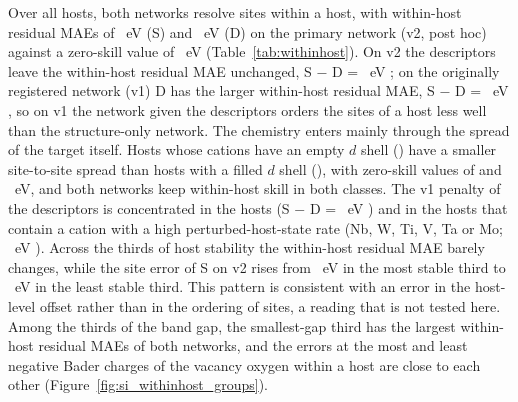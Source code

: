 Over all hosts, both networks resolve sites within a host, with within-host residual MAEs of
\numWithinHostBreakdownGroupsPooledAllVTwoSWithinHostMaePoint{}~eV (S) and
\numWithinHostBreakdownGroupsPooledAllVTwoDWithinHostMaePoint{}~eV (D) on the primary network (v2, post hoc)
against a zero-skill value of \numWithinHostBreakdownGroupsPooledAllVTwoSZeroSkillMaePoint{}~eV
(Table~\ref{tab:withinhost}). On v2 the descriptors leave the within-host residual MAE unchanged, S $-$ D =
\numWithinHostBreakdownGroupsPooledAllDifferencesSMinusDVTwoWithinHostMaePoint{}~eV
\ci{\numWithinHostBreakdownGroupsPooledAllDifferencesSMinusDVTwoWithinHostMaeCiNinetyFiveItemOne{}}{\numWithinHostBreakdownGroupsPooledAllDifferencesSMinusDVTwoWithinHostMaeCiNinetyFiveItemTwo{}};
on the originally registered network (v1) D has the larger within-host residual MAE, S $-$ D =
\numWithinHostBreakdownGroupsPooledAllDifferencesSMinusDVOneWithinHostMaePoint{}~eV
\ci{\numWithinHostBreakdownGroupsPooledAllDifferencesSMinusDVOneWithinHostMaeCiNinetyFiveItemOne{}}{\numWithinHostBreakdownGroupsPooledAllDifferencesSMinusDVOneWithinHostMaeCiNinetyFiveItemTwo{}},
so on v1 the network given the descriptors orders the sites of a host less well than the structure-only network.
The chemistry enters mainly through the spread of the target itself. Hosts whose cations have an empty $d$ shell
(\dzero{}) have a smaller site-to-site spread than hosts with a filled $d$ shell (\dten{}), with zero-skill values of
\numWithinHostBreakdownGroupsDClassDZeroVTwoSZeroSkillMaePoint{} and
\numWithinHostBreakdownGroupsDClassDTenVTwoSZeroSkillMaePoint{}~eV, and both networks keep within-host skill in both
classes. The v1 penalty of the descriptors is concentrated in the \dten{} hosts
(S $-$ D = \numWithinHostBreakdownGroupsDClassDTenDifferencesSMinusDVOneWithinHostMaePoint{}~eV
\ci{\numWithinHostBreakdownGroupsDClassDTenDifferencesSMinusDVOneWithinHostMaeCiNinetyFiveItemOne{}}{\numWithinHostBreakdownGroupsDClassDTenDifferencesSMinusDVOneWithinHostMaeCiNinetyFiveItemTwo{}})
and in the hosts that contain a cation with a high perturbed-host-state rate (Nb, W, Ti, V, Ta or Mo;
\numWithinHostBreakdownGroupsPhsPronePhsProneDifferencesSMinusDVOneWithinHostMaePoint{}~eV
\ci{\numWithinHostBreakdownGroupsPhsPronePhsProneDifferencesSMinusDVOneWithinHostMaeCiNinetyFiveItemOne{}}{\numWithinHostBreakdownGroupsPhsPronePhsProneDifferencesSMinusDVOneWithinHostMaeCiNinetyFiveItemTwo{}}).
Across the thirds of host stability the within-host residual MAE barely changes, while the site error of S on v2 rises
from \numWithinHostBreakdownGroupsStabilityTercileLowerVTwoSMaePoint{}~eV in the most stable third to
\numWithinHostBreakdownGroupsStabilityTercileUpperVTwoSMaePoint{}~eV in the least stable third. This pattern is
consistent with an error in the host-level offset rather than in the ordering of sites, a reading that is not
tested here. Among the thirds of the band gap, the smallest-gap third has the largest within-host residual MAEs of both
networks, and the errors at the most and least negative Bader charges of the vacancy oxygen within a host are
close to each other (Figure~\ref{fig:si_withinhost_groups}).

